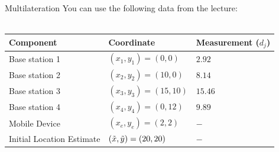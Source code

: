 \documentclass[twoside]{article}
\begin{document}
\begin{task}{Multilateration}{}{}
\clearpage
You can use the following data from the lecture:\\
\\
\begin{tabularx}{0.8\textwidth} { 
  | >{\raggedright\arraybackslash}X 
  | >{\raggedright\arraybackslash}X 
  | >{\raggedright\arraybackslash}X | }
 \hline
 \textbf{Component} & \textbf{Coordinate} & \textbf{Measurement} ($d_{j}$) \\
 \hline
 Base station 1  & $(x_{1}, y_{1}) = (0, 0)$  & $2.92$ \\
 \hline
 Base station 2  & $(x_{2}, y_{2}) = (10, 0)$  & $8.14$ \\
 \hline
 Base station 3  & $(x_{3}, y_{3}) = (15, 10)$  & $15.46$ \\
 \hline
 Base station 4  & $(x_{4}, y_{4}) = (0, 12)$  & $9.89$ \\
 \hline
 Mobile Device  & $(x_{e}, y_{e}) = (2, 2)$  & $-$ \\
 \hline
 Initial Location Estimate  & $(\Tilde{x}, \Tilde{y}) = (20, 20)$  & $-$ \\
\hline
\end{tabularx}

\end{task}
\end{document}
